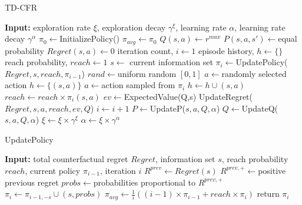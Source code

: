 \documentclass{aamas2013}
\begin{document}
    \begin{algorithm}
    \caption{TD-CFR}
    \label{alg-tdcfr}
    \begin{algorithmic}[1]
    \STATE \textbf{Input:} exploration rate $\xi$, exploration decay $\gamma^{\xi}$, learning rate $\alpha$, learning rate decay $\gamma^{\alpha}$
    \STATE $\pi_0 \leftarrow$InitializePolicy()
    \STATE $\pi_{avg} \leftarrow \pi_0$
        \STATE $Q(s,a) \leftarrow r^{max}$
        \STATE $P(s,a,s') \leftarrow$equal probability
        \STATE $Regret(s,a) \leftarrow 0$
    \ENDFOR
    \STATE iteration count, $i \leftarrow 1$
    \LOOP
        \STATE episode history, $h \leftarrow \{\}$
        \STATE reach probability, $reach \leftarrow 1$
          \STATE $s \leftarrow$ current information set
          \STATE $\pi_{i} \leftarrow$UpdatePolicy($Regret, s, reach, \pi_{i-1}$)
          \STATE $rand \leftarrow$uniform random $[0,1]$
            \STATE $a \leftarrow$randomly selected action
            \STATE $h \leftarrow \{(s,a)\}$
          \ELSE
            \STATE $a \leftarrow$action sampled from $\pi_i$
            \STATE $h \leftarrow h \cup (s,a)$
          \ENDIF
          \STATE $reach \leftarrow reach \times \pi_i(s,a)$
          \STATE $ev \leftarrow$ExpectedValue(Q,s)
          \STATE UpdateRegret($Regret,s,a,reach,ev,Q$)
          \STATE $i \leftarrow i+1$
        \ENDWHILE
          \STATE $P \leftarrow$UpdateP($s,a,Q,\alpha$)
          \STATE $Q \leftarrow$UpdateQ($s,a,Q,\alpha$)
        \ENDFOR
        \STATE $\xi \leftarrow \xi \times \gamma^{\xi}$
        \STATE $\alpha \leftarrow \xi \times \gamma^{\alpha}$
    \ENDLOOP
    \end{algorithmic}
    \end{algorithm}

    \begin{algorithm}
    \caption{UpdatePolicy}
    \label{alg-tdcfr-updatepolicy}
    \begin{algorithmic}[1]
    \STATE \textbf{Input:} total counterfactual regret $Regret$, information set $s$, reach probability $reach$, current policy $\pi_{i-1}$, iteration $i$
    \STATE $R^{prev} \leftarrow Regret(s)$
    \STATE $R^{prev,+} \leftarrow$positive previous regret
    \STATE $probs \leftarrow$probabilities proportional to $R^{prev,+}$
    \STATE $\pi_{i} \leftarrow \pi_{i-1,-s} \cup (s,probs)$
    \STATE $\pi_{avg} \leftarrow \frac{1}{i} ((i-1)\times \pi_{i-1} + reach \times \pi_i)$
    \STATE return $\pi_{i}$
    \end{algorithmic}
    \end{algorithm}
\end{document}
